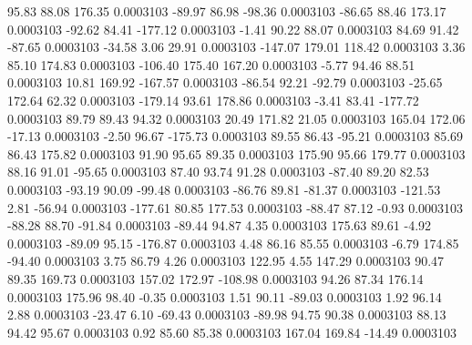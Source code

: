        95.83       88.08      176.35     0.0003103
      -89.97       86.98      -98.36     0.0003103
      -86.65       88.46      173.17     0.0003103
      -92.62       84.41     -177.12     0.0003103
       -1.41       90.22       88.07     0.0003103
       84.69       91.42      -87.65     0.0003103
      -34.58        3.06       29.91     0.0003103
     -147.07      179.01      118.42     0.0003103
        3.36       85.10      174.83     0.0003103
     -106.40      175.40      167.20     0.0003103
       -5.77       94.46       88.51     0.0003103
       10.81      169.92     -167.57     0.0003103
      -86.54       92.21      -92.79     0.0003103
      -25.65      172.64       62.32     0.0003103
     -179.14       93.61      178.86     0.0003103
       -3.41       83.41     -177.72     0.0003103
       89.79       89.43       94.32     0.0003103
       20.49      171.82       21.05     0.0003103
      165.04      172.06      -17.13     0.0003103
       -2.50       96.67     -175.73     0.0003103
       89.55       86.43      -95.21     0.0003103
       85.69       86.43      175.82     0.0003103
       91.90       95.65       89.35     0.0003103
      175.90       95.66      179.77     0.0003103
       88.16       91.01      -95.65     0.0003103
       87.40       93.74       91.28     0.0003103
      -87.40       89.20       82.53     0.0003103
      -93.19       90.09      -99.48     0.0003103
      -86.76       89.81      -81.37     0.0003103
     -121.53        2.81      -56.94     0.0003103
     -177.61       80.85      177.53     0.0003103
      -88.47       87.12       -0.93     0.0003103
      -88.28       88.70      -91.84     0.0003103
      -89.44       94.87        4.35     0.0003103
      175.63       89.61       -4.92     0.0003103
      -89.09       95.15     -176.87     0.0003103
        4.48       86.16       85.55     0.0003103
       -6.79      174.85      -94.40     0.0003103
        3.75       86.79        4.26     0.0003103
      122.95        4.55      147.29     0.0003103
       90.47       89.35      169.73     0.0003103
      157.02      172.97     -108.98     0.0003103
       94.26       87.34      176.14     0.0003103
      175.96       98.40       -0.35     0.0003103
        1.51       90.11      -89.03     0.0003103
        1.92       96.14        2.88     0.0003103
      -23.47        6.10      -69.43     0.0003103
      -89.98       94.75       90.38     0.0003103
       88.13       94.42       95.67     0.0003103
        0.92       85.60       85.38     0.0003103
      167.04      169.84      -14.49     0.0003103
